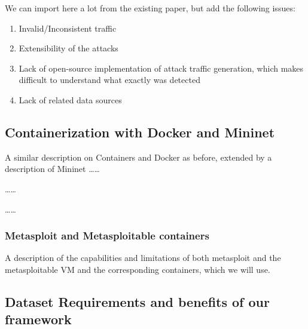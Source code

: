 \documentclass{article}
\begin{document}
We can import here a lot from the existing paper, but add the following issues:
\begin{enumerate}
\item Invalid/Inconsistent traffic
\item Extensibility of the attacks
\item Lack of open-source implementation of attack traffic generation, which makes difficult to understand what exactly was detected
\item Lack of related data sources
\end{enumerate}


\subsection{Containerization with Docker and Mininet}

A similar description on Containers and Docker as before, extended by a description of Mininet
\dots \dots

\dots \dots

\dots \dots

\subsubsection{Metasploit and Metasploitable containers}

A description of the capabilities and limitations of both metasploit and the metasploitable VM and the corresponding containers, which we will use.






\subsection{Dataset Requirements and benefits of our framework}
\end{document}
